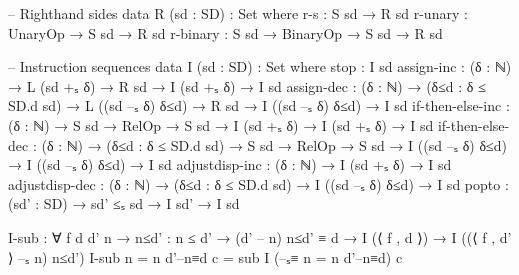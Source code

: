 \documentclass{article}
\begin{document}
\begin{prev}
\begin{code}
-- Righthand sides
data R (sd : SD) : Set where
    r-s : S sd → R sd
    r-unary : UnaryOp → S sd → R sd
    r-binary : S sd → BinaryOp → S sd → R sd

-- Instruction sequences
data I (sd : SD) : Set where
    stop : I sd
    assign-inc : (δ : ℕ) → L (sd +ₛ δ) → R sd → I (sd +ₛ δ) → I sd
    assign-dec : (δ : ℕ) → (δ≤d : δ ≤ SD.d sd) → L ((sd –ₛ δ) δ≤d) 
                    → R sd → I ((sd –ₛ δ) δ≤d) → I sd
    if-then-else-inc : (δ : ℕ) → S sd → RelOp → S sd 
                            → I (sd +ₛ δ) → I (sd +ₛ δ) → I sd
    if-then-else-dec : (δ : ℕ) → (δ≤d : δ ≤ SD.d sd) 
                            → S sd → RelOp → S sd 
                            → I ((sd –ₛ δ) δ≤d) 
                            → I ((sd –ₛ δ) δ≤d) → I sd
    adjustdisp-inc : (δ : ℕ) → I (sd +ₛ δ) → I sd
    adjustdisp-dec : (δ : ℕ) → (δ≤d : δ ≤ SD.d sd) 
                        → I ((sd –ₛ δ) δ≤d) → I sd
    popto : (sd' : SD) → sd' ≤ₛ sd → I sd' → I sd 


I-sub : ∀ {f d d' n} → {n≤d' : n ≤ d'} → (d' – n) n≤d' ≡ d 
            → I (⟨ f , d ⟩) → I ((⟨ f , d' ⟩ –ₛ n) n≤d')
I-sub {n = n} d'–n≡d c = sub I (–ₛ≡ {n = n} d'–n≡d) c 
\end{code}
\end{prev}
\end{document}
